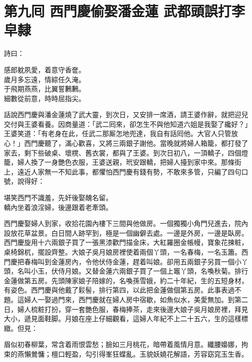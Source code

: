 
\chapter*{第九囘 西門慶偷娶潘金蓮 武都頭誤打李皁隸}


詩曰：

\begin{myquote}
感郎躭夙愛，着意守香奩。\\歲月多忘遠，情綜任久淹。\\于飛期燕燕，比翼誓鶼鶼。\\細數從前意，時時屈指尖。
\end{myquote}

話說西門慶與潘金蓮燒了武大靈，到次日，又安排一席酒，請王婆作辭，就把迎兒交付與王婆看養。因商量道：「武二囘來，卻怎生不與他知道六姐是我娶了纔好？」王婆笑道：「有老身在此，任武二那厮怎地兜達，我自有話囘他。大官人只管放心！」西門慶聽了，滿心歡喜，又將三兩銀子謝他。當晚就將婦人箱籠，都打發了家去，剩下些破桌、壞櫈、舊衣裳，都與了王婆。到次日初八，一頂轎子，四個燈籠，婦人換了一身艷色衣服，王婆送親，玳安跟轎，把婦人擡到家中來。那條街上，遠近人家無一不知此事，都懼怕西門慶有錢有勢，不敢來多管，只編了四句口號，說得好：

\begin{myquote}
堪笑西門不識羞，先奸後娶醜名留。\\轎內坐着浪淫婦，後邊跟着老牽頭。
\end{myquote}

西門慶娶婦人到家，收拾花園內樓下三間與他做房。一個獨獨小角門兒進去，院內設放花草盆景。白日間人跡罕到，極是一個幽僻去處。一邊是外房，一邊是臥房。西門慶旋用十六兩銀子買了一張黑漆歡門描金床，大紅羅圈金帳幔，寶象花揀粧，桌椅錦杌，擺設齊整。大娘子吳月娘房裡使着兩個丫頭，一名春梅，一名玉簫。西門慶把春梅叫到金蓮房內，令他伏侍金蓮，趕着叫娘。卻用五兩銀子另買一個小丫頭，名叫小玉，伏侍月娘。又替金蓮六兩銀子買了一個上竈丫頭，名喚秋菊。排行金蓮做第五房。先頭陳家娘子陪嫁的，名喚孫雪娥，約二十年紀，生的五短身材，有姿色。西門慶與他戴了鬏髻，排行第四，以此把金蓮做個第五房。此事表過不題。這婦人一娶過門來，西門慶就在婦人房中宿歇，如魚似水，美愛無加。到第二日，婦人梳粧打扮，穿一套艷色服，春梅捧茶，走來後邊大娘子吳月娘房裡，拜見大小，遞見面鞋脚。月娘在座上仔細觀看，這婦人年紀不上二十五六，生的這樣標緻。但見：

\begin{myquote}
眉似初春柳葉，常含着雨恨雲愁；臉如三月桃花，暗帶着風情月意。纖腰嬝娜，拘束的燕懶鶯慵；檀口輕盈，勾引得峯狂蝶亂。玉貌妖嬈花解語，芳容窈窕玉生香。
\end{myquote}

